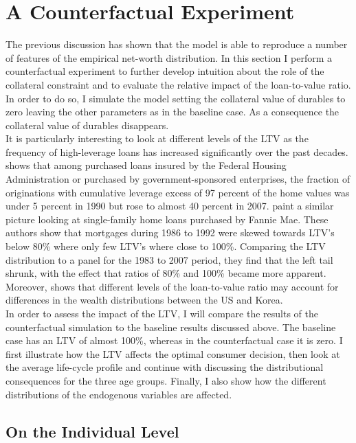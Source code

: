 \documentclass[a4paper,12pt,legno]{article}
\begin{document}
\section{A Counterfactual Experiment}
\label{counterfactual}
The previous discussion has shown that the model is able to reproduce a number of features of the empirical net-worth distribution. In this section I perform a counterfactual experiment to further develop intuition about the role of the collateral constraint and to evaluate the relative impact of the loan-to-value ratio. In order to do so, I simulate the model setting the collateral value of durables to zero leaving the other parameters as in the baseline case. As a consequence the collateral value of durables disappears.\\
It is particularly interesting to look at different levels of the LTV as the frequency of high-leverage loans has increased significantly over the past decades. \cite{pinto2010government} shows that among purchased loans insured by the Federal Housing Administration or purchased by government-sponsored enterprises, the fraction of originations with cumulative leverage excess of 97 percent of the home values was under 5 percent in 1990 but rose to almost 40 percent in 2007. \cite{bokhari2013did} paint a similar picture looking at single-family home loans purchased by Fannie Mae. These authors show that mortgages during 1986 to 1992 were skewed towards LTV's below 80\% where only few LTV's where close to 100\%. Comparing the LTV distribution to a panel for the 1983 to 2007 period, they find that the left tail shrunk, with the effect that ratios of 80\% and 100\% became more apparent. Moreover, \cite{cho2012accounting} shows that different levels of the loan-to-value ratio  may account for differences in the wealth distributions between the US and Korea.\\
In order to assess the impact of the LTV, I will compare the results of the counterfactual simulation to the baseline results discussed above. The baseline case has an LTV of almost 100\%, whereas in the counterfactual case it is zero. I first illustrate how the LTV affects the optimal consumer decision, then look at the average life-cycle profile and continue with discussing the distributional consequences for the three age groups. Finally, I also show how the different distributions of the endogenous variables are affected. 

\subsection{On the Individual Level}
\end{document}
